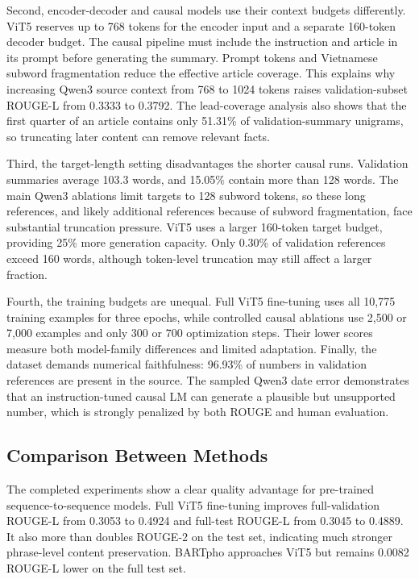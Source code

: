 \documentclass[conference]{IEEEtran}
\begin{document}
Second, encoder-decoder and causal models use their context budgets differently. ViT5 reserves up to 768 tokens for the encoder input and a separate 160-token decoder budget. The causal pipeline must include the instruction and article in its prompt before generating the summary. Prompt tokens and Vietnamese subword fragmentation reduce the effective article coverage. This explains why increasing Qwen3 source context from 768 to 1024 tokens raises validation-subset ROUGE-L from 0.3333 to 0.3792. The lead-coverage analysis also shows that the first quarter of an article contains only 51.31\% of validation-summary unigrams, so truncating later content can remove relevant facts.

Third, the target-length setting disadvantages the shorter causal runs. Validation summaries average 103.3 words, and 15.05\% contain more than 128 words. The main Qwen3 ablations limit targets to 128 subword tokens, so these long references, and likely additional references because of subword fragmentation, face substantial truncation pressure. ViT5 uses a larger 160-token target budget, providing 25\% more generation capacity. Only 0.30\% of validation references exceed 160 words, although token-level truncation may still affect a larger fraction.

Fourth, the training budgets are unequal. Full ViT5 fine-tuning uses all 10,775 training examples for three epochs, while controlled causal ablations use 2,500 or 7,000 examples and only 300 or 700 optimization steps. Their lower scores measure both model-family differences and limited adaptation. Finally, the dataset demands numerical faithfulness: 96.93\% of numbers in validation references are present in the source. The sampled Qwen3 date error demonstrates that an instruction-tuned causal LM can generate a plausible but unsupported number, which is strongly penalized by both ROUGE and human evaluation.

\subsection{Comparison Between Methods}
The completed experiments show a clear quality advantage for pre-trained sequence-to-sequence models. Full ViT5 fine-tuning improves full-validation ROUGE-L from 0.3053 to 0.4924 and full-test ROUGE-L from 0.3045 to 0.4889. It also more than doubles ROUGE-2 on the test set, indicating much stronger phrase-level content preservation. BARTpho approaches ViT5 but remains 0.0082 ROUGE-L lower on the full test set.
\end{document}
